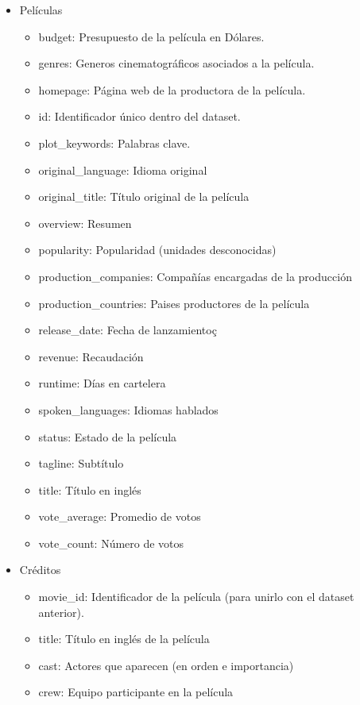 \begin{itemize}
    \item Películas
    \begin{itemize}
        \item budget: Presupuesto de la película en Dólares.
        \item genres: Generos cinematográficos asociados a la película.
        \item homepage: Página web de la productora de la película.
        \item id: Identificador único dentro del dataset.
        \item plot\_keywords: Palabras clave.
        \item original\_language: Idioma original
        \item original\_title: Título original de la película
        \item overview: Resumen
        \item popularity: Popularidad (unidades desconocidas)
        \item production\_companies: Compañías encargadas de la producción
        \item production\_countries: Paises productores de la película
        \item release\_date: Fecha de lanzamientoç
        \item revenue: Recaudación
        \item runtime: Días en cartelera
        \item spoken\_languages: Idiomas hablados
        \item status: Estado de la película
        \item tagline: Subtítulo
        \item title: Título en inglés
        \item vote\_average: Promedio de votos
        \item vote\_count: Número de votos
    \end{itemize}
    \item Créditos
    \begin{itemize}
        \item movie\_id: Identificador de la película (para unirlo con el dataset anterior).
        \item title: Título en inglés de la película
        \item cast: Actores que aparecen (en orden e importancia)
        \item crew: Equipo participante en la película
    \end{itemize}
\end{itemize}

